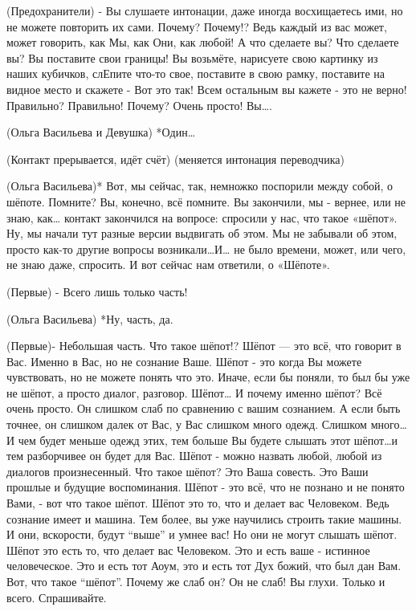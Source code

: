 (Предохранители) - Вы слушаете интонации, даже иногда восхищаетесь ими, но не можете повторить их сами. Почему? Почему!? Ведь каждый из вас может, может говорить, как Мы, как Они, как любой! А что сделаете вы? Что сделаете вы?  Вы поставите свои границы! Вы возьмёте, нарисуете свою картинку из наших кубичков, слЕпите что-то свое, поставите в свою рамку, поставите на видное место и скажете - Вот это так! Всем остальным вы кажете - это не верно! Правильно? Правильно!  Почему? Очень просто! Вы….

(Ольга Васильева и Девушка) *Один… 


(Контакт прерывается, идёт счёт)
(меняется интонация переводчика)

(Ольга Васильева)* Вот, мы сейчас, так, немножко поспорили между собой,  о шёпоте. Помните? Вы, конечно, всё помните. Вы закончили, мы - вернее, или не знаю, как… контакт закончился на вопросе: спросили у нас, что такое «шёпот». Ну, мы начали тут разные версии выдвигать об этом. Мы не забывали об этом, просто как-то другие вопросы возникали…И… не было времени, может, или чего, не знаю даже, спросить. И вот сейчас нам ответили, о «Шёпоте».

(Первые) - Всего лишь только часть!

(Ольга Васильева) *Ну, часть, да.

(Первые)-  Небольшая часть. Что такое шёпот!? Шёпот — это всё, что говорит в Вас. Именно в Вас, но не сознание Ваше. Шёпот - это когда Вы можете чувствовать, но не можете понять что это. Иначе, если бы поняли, то был бы уже не шёпот, а просто диалог, разговор. Шёпот… И почему именно шёпот? Всё очень просто. Он слишком слаб по сравнению с вашим сознанием. А если быть точнее, он слишком далек от Вас, у Вас слишком много одежд. Слишком много…И чем будет меньше одежд этих, тем больше Вы будете слышать этот шёпот…и тем разборчивее он будет для Вас. Шёпот - можно назвать любой, любой из диалогов произнесенный. Что такое шёпот? Это Ваша совесть. Это Ваши прошлые и будущие воспоминания. Шёпот - это всё, что не познано и не понято Вами, - вот что такое шёпот. Шёпот это то, что и делает вас Человеком. Ведь сознание имеет и машина. Тем более, вы уже научились строить такие машины. И они, вскорости, будут “выше” и умнее вас! Но они не могут слышать шёпот. Шёпот это есть то, что делает вас Человеком. Это и есть ваше - истинное человеческое. Это и есть тот Аоум, это и есть тот Дух божий, что был дан Вам. Вот, что такое “шёпот”. Почему же слаб он? Он не слаб! Вы глухи. Только и всего. Спрашивайте.

